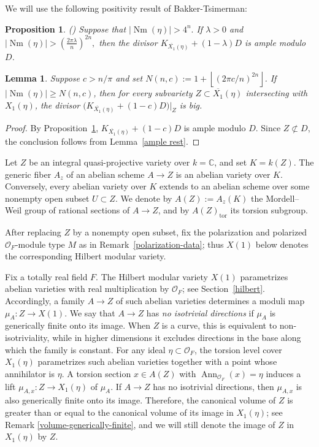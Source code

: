 \documentclass[12 pt]{amsart}
\newtheorem{Lemma}[theorem]{Lemma}
\newtheorem{Proposition}[theorem]{Proposition}
\theoremstyle{definition}
\newcommand{\Xb}{\overline{X_{1}}}
\newcommand{\Nm}{\operatorname{Nm}}
\begin{document}
We will use the following positivity result of Bakker-Tsimerman: 
\begin{Proposition}\label{Tsi}(\cite[Theorem E]{bakker2018geometric})\label{PosCan} Suppose that $|\Nm(\eta)|>4^n.$
If $\lambda> 0$ and
\(
|\Nm(\eta)|>
\left(\frac{2\pi\lambda}{n}\right)^{2n},
\)
then the divisor
\(
K_{\Xb(\eta)}+(1-\lambda)D
\)
is ample modulo $D$.
\end{Proposition}



\begin{Lemma}\label{Bigness of small twist}
Suppose $c>n/\pi$ and set
$N(n,c):=1+\left\lfloor(2\pi c/n)^{2n}\right\rfloor$.
If $|\Nm(\eta)|\ge N(n,c)$, then for every subvariety
$Z\subset\Xb(\eta)$ intersecting with $X_1(\eta)$, the divisor
\(
\bigl(K_{\Xb(\eta)}+(1-c)D\bigr)|_Z
\)
is big.
\end{Lemma}

\begin{proof}
By Proposition~\ref{Tsi},
$K_{\Xb(\eta)}+(1-c)D$ is ample modulo $D$. Since $Z\not\subset D$,
the conclusion follows from Lemma~\ref{ample rest}.
\end{proof}


Let \(Z\) be an integral quasi-projective variety over \(k=\mathbb C\),
and set \(K=k(Z)\). The generic fiber \(A_z\) of an abelian scheme
\(A\to Z\) is an abelian variety over \(K\). Conversely, every abelian
variety over \(K\) extends to an abelian scheme over some nonempty open
subset \(U\subset Z\). We denote by
\(
A(Z):=A_z(K)
\)
the Mordell--Weil group of rational sections of \(A\to Z\), and by
\(A(Z)_{\mathrm{tor}}\) its torsion subgroup. 

After replacing \(Z\) by a nonempty open subset, fix the polarization and polarized \(\mathcal O_F\)-module type \(M\) as in Remark~\ref{polarization-data}; thus \(X(1)\) below denotes the corresponding Hilbert modular variety.

Fix a totally real field \(F\). The Hilbert modular variety \(X(1)\)
parametrizes abelian varieties with real multiplication by
\(\mathcal O_F\); see Section~\ref{hilbert}. Accordingly, a family
\(A\to Z\) of such abelian varieties determines a moduli map
\(
\mu_A\colon Z\longrightarrow X(1).
\)
We say that \(A\to Z\) has \emph{no isotrivial directions} if
\(\mu_A\) is generically finite onto its image. When \(Z\) is a curve,
this is equivalent to non-isotriviality, while in higher dimensions it
excludes directions in the base along which the family is constant.
For any ideal \(\eta\subset\mathcal O_F\), the torsion level cover
\(X_1(\eta)\) parametrizes such abelian varieties together with a point
whose annihilator is \(\eta\). A torsion section
\(x\in A(Z)\) with
\(
\operatorname{Ann}_{\mathcal O_F}(x)=\eta
\)
induces a lift
\(
\mu_{A,x}\colon Z\longrightarrow X_1(\eta)
\)
of \(\mu_A\). If \(A\to Z\) has no isotrivial directions, then
\(\mu_{A,x}\) is also generically finite onto its image. Therefore, the canonical volume of $Z$ is greater than or equal to the canonical volume of its image in $X_1(\eta)$; see Remark \ref{volume-generically-finite}, and we will still denote the image of $Z$ in $X_1(\eta)$ by $Z.$
\end{document}
